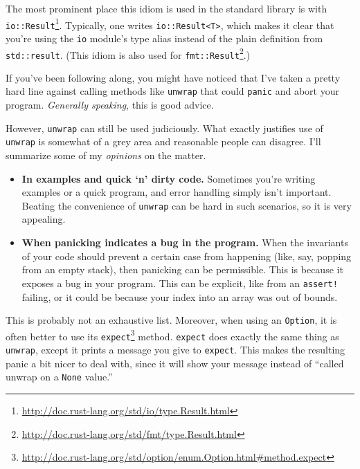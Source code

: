 \documentclass[a4paper,]{book}
\renewcommand{\href}[2]{#2\footnote{\url{#1}}}
\begin{document}
The most prominent place this idiom is used in the standard library is
with
\href{http://doc.rust-lang.org/std/io/type.Result.html}{\texttt{io::Result}}.
Typically, one writes \texttt{io::Result\textless{}T\textgreater{}},
which makes it clear that you're using the \texttt{io} module's type
alias instead of the plain definition from \texttt{std::result}. (This
idiom is also used for
\href{http://doc.rust-lang.org/std/fmt/type.Result.html}{\texttt{fmt::Result}}.)


If you've been following along, you might have noticed that I've taken a
pretty hard line against calling methods like \texttt{unwrap} that could
\texttt{panic} and abort your program. \emph{Generally speaking}, this
is good advice.

However, \texttt{unwrap} can still be used judiciously. What exactly
justifies use of \texttt{unwrap} is somewhat of a grey area and
reasonable people can disagree. I'll summarize some of my
\emph{opinions} on the matter.

\begin{itemize}
\itemsep1pt\parskip0pt
\item
  \textbf{In examples and quick `n' dirty code.} Sometimes you're
  writing examples or a quick program, and error handling simply isn't
  important. Beating the convenience of \texttt{unwrap} can be hard in
  such scenarios, so it is very appealing.
\item
  \textbf{When panicking indicates a bug in the program.} When the
  invariants of your code should prevent a certain case from happening
  (like, say, popping from an empty stack), then panicking can be
  permissible. This is because it exposes a bug in your program. This
  can be explicit, like from an \texttt{assert!} failing, or it could be
  because your index into an array was out of bounds.
\end{itemize}

This is probably not an exhaustive list. Moreover, when using an
\texttt{Option}, it is often better to use its
\href{http://doc.rust-lang.org/std/option/enum.Option.html\#method.expect}{\texttt{expect}}
method. \texttt{expect} does exactly the same thing as \texttt{unwrap},
except it prints a message you give to \texttt{expect}. This makes the
resulting panic a bit nicer to deal with, since it will show your
message instead of ``called unwrap on a \texttt{None} value.''
\end{document}

